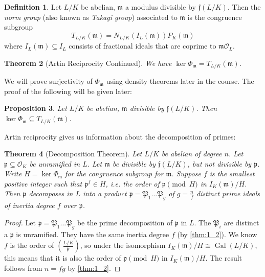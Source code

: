 \documentclass[11pt]{article}
\theoremstyle{definition}
\newtheorem{definition}{Definition}[section]
\theoremstyle{plain}
\newtheorem{theorem}[definition]{Theorem}
\newtheorem{proposition}[definition]{Proposition}
\theoremstyle{remark}
\DeclareMathOperator{\Gal}{Gal}
\newcommand{\cO}{\mathcal{O}}
\newcommand{\cp}{\mathfrak{P}}
\newcommand{\ff}{\mathfrak{f}}
\newcommand{\fp}{\mathfrak{p}}
\newcommand{\fm}{\mathfrak{m}}
\newcommand{\leg}[2]{\left(\frac{#1}{#2}\right)}
\begin{document}
\begin{definition}\label{def:3_8}
    Let $L/K$ be abelian, $\fm$ a modulus divisible by $\ff(L/K)$. Then the \emph{norm group} (also known as \emph{Takagi group}) associated to $\fm$ is the congruence subgroup
    \begin{equation*}
        T_{L/K}(\fm) = N_{L/K}(I_L(\fm))P_K(\fm)
    \end{equation*}
    where $I_L(\fm) \subseteq I_L$ consists of fractional ideals that are coprime to $\fm \cO_L$.
\end{definition}

\begin{theorem}[Artin Reciprocity Continued]\label{thm:3_9}
    We have $\ker \Phi_\fm = T_{L/K}(\fm)$.
\end{theorem}

We will prove surjectivity of $\Phi_\fm$ using density theorems later in the course. The proof of the following will be given later:

\begin{proposition}\label{prop:3_10}
    Let $L/K$ be abelian, $\fm$ divisible by $\ff(L/K)$. Then $\ker \Phi_\fm \subseteq T_{L/K}(\fm)$.
\end{proposition}

\noindent Artin reciprocity gives us information about the decomposition of primes:

\begin{theorem}[Decomposition Theorem]\label{thm:3_11}
    Let $L/K$ be abelian of degree $n$. Let $\fp \subseteq \cO_K$ be unramified in $L$. Let $\fm$ be divisible by $\ff(L/K)$, but not divisible by $\fp$. Write $H = \ker \Phi_\fm$ for the congruence subgroup for $\fm$. Suppose $f$ is the smallest positive integer such that $\fp^f \in H$, i.e. the order of $\fp \pmod{H}$ in $I_K(\fm) / H$. Then $\fp$ decomposes in $L$ into a product $\fp = \cp_1 \ldots \cp_g$ of $g = \frac{n}{f}$ distinct prime ideals of inertia degree $f$ over $\fp$.
\end{theorem}
\begin{proof}
    Let $\fp = \cp_1 \ldots \cp_g$ be the prime decomposition of $\fp$ in $L$. The $\cp_i$ are distinct a $\fp$ is unramified. They have the same inertia degree $f$ (by \autoref{thm:1_2}). We know $f$ is the order of $\leg{L/K}{\fp}$, so under the isomorphism $I_K(\fm) / H \cong \Gal(L/K)$, this means that it is also the order of $\fp \pmod{H}$ in $I_K(\fm) / H$. The result follows from $n = fg$ by \autoref{thm:1_2}.
\end{proof}
\end{document}
